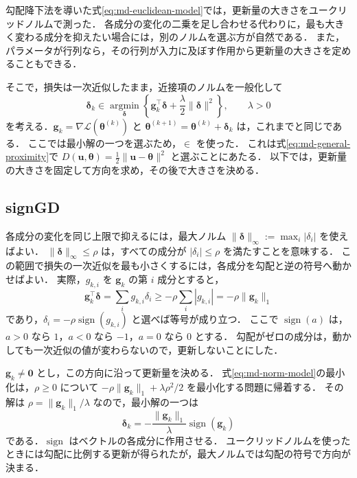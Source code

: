 \documentclass[../main.tex]{subfiles}
\begin{document}
勾配降下法を導いた式\eqref{eq:md-euclidean-model}では，更新量の大きさをユークリッドノルムで測った．
各成分の変化の二乗を足し合わせる代わりに，最も大きく変わる成分を抑えたい場合には，別のノルムを選ぶ方が自然である．
また，パラメータが行列なら，その行列が入力に及ぼす作用から更新量の大きさを定めることもできる．

そこで，損失は一次近似したまま，近接項のノルムを一般化して
\begin{equation}
  \bm{\delta}_k\in\underset{\bm{\delta}}{\operatorname{argmin}}
  \left\{\bm{g}_k^\top\bm{\delta}
  +\frac{\lambda}{2}\|\bm{\delta}\|^2\right\},
  \qquad\lambda>0
  \label{eq:md-norm-model}
\end{equation}
を考える．$\bm{g}_k=\nabla\mathcal{L}(\bm{\theta}^{(k)})$ と
$\bm{\theta}^{(k+1)}=\bm{\theta}^{(k)}+\bm{\delta}_k$ は，これまでと同じである．
ここでは最小解の一つを選ぶため，$\in$ を使った．
これは式\eqref{eq:md-general-proximity}で
$D(\bm{u},\bm{\theta})=\tfrac12\|\bm{u}-\bm{\theta}\|^2$ と選ぶことにあたる．
以下では，更新量の大きさを固定して方向を求め，その後で大きさを決める\cite{bernstein2024norm}．

\subsection{signGD}

各成分の変化を同じ上限で抑えるには，最大ノルム
$\|\bm{\delta}\|_\infty:=\max_i|\delta_i|$ を使えばよい．
$\|\bm{\delta}\|_\infty\leq\rho$ は，すべての成分が $|\delta_i|\leq\rho$ を満たすことを意味する．
この範囲で損失の一次近似を最も小さくするには，各成分を勾配と逆の符号へ動かせばよい．
実際，$g_{k,i}$ を $\bm{g}_k$ の第 $i$ 成分とすると，
\begin{equation}
  \bm{g}_k^\top\bm{\delta}
  =\sum_i g_{k,i}\delta_i
  \geq-\rho\sum_i|g_{k,i}|
  =-\rho\|\bm{g}_k\|_1
  \label{eq:md-sign-direction}
\end{equation}
であり，$\delta_i=-\rho\operatorname{sign}(g_{k,i})$ と選べば等号が成り立つ．
ここで $\operatorname{sign}(a)$ は，$a>0$ なら $1$，$a<0$ なら $-1$，$a=0$ なら $0$ とする．
勾配がゼロの成分は，動かしても一次近似の値が変わらないので，更新しないことにした．

$\bm{g}_k\ne\bm{0}$ とし，この方向に沿って更新量を決める．
式\eqref{eq:md-norm-model}の最小化は，$\rho\geq0$ について
$-\rho\|\bm{g}_k\|_1+\lambda\rho^2/2$ を最小化する問題に帰着する．
その解は $\rho=\|\bm{g}_k\|_1/\lambda$ なので，最小解の一つは
\begin{equation}
  \bm{\delta}_k
  =-\frac{\|\bm{g}_k\|_1}{\lambda}
  \operatorname{sign}(\bm{g}_k)
  \label{eq:md-sign-proximal-solution}
\end{equation}
である．$\operatorname{sign}$ はベクトルの各成分に作用させる．
ユークリッドノルムを使ったときには勾配に比例する更新が得られたが，最大ノルムでは勾配の符号で方向が決まる．
\end{document}
